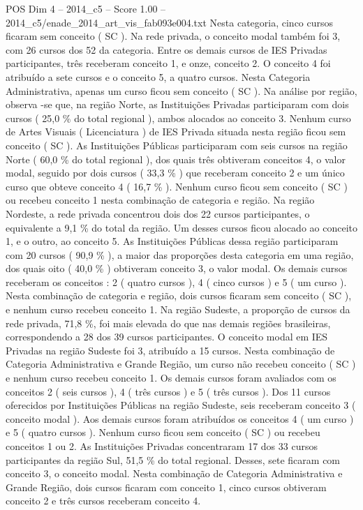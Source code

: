 \begin{textsample}{POS Dim 4 – 2014\_c5 – Score 1.00 – 2014\_c5/enade\_2014\_art\_vis\_fab093e004.txt}
Nesta categoria, cinco cursos ficaram sem conceito ( SC ).
Na rede privada, o conceito modal também foi 3, com 26 cursos dos 52 da categoria.
Entre os demais cursos de IES Privadas participantes, três receberam conceito 1, e onze, conceito 2.
O conceito 4 foi atribuído a sete cursos e o conceito 5, a quatro cursos.
Nesta Categoria Administrativa, apenas um curso ficou sem conceito ( SC ).
Na análise por região, observa -se que, na região Norte, as Instituições Privadas participaram com dois cursos ( 25,0 \% do total regional ), ambos alocados ao conceito 3.
Nenhum curso de Artes Visuais ( Licenciatura ) de IES Privada situada nesta região ficou sem conceito ( SC ).
As Instituições Públicas participaram com seis cursos na região Norte ( 60,0 \% do total regional ), dos quais três obtiveram conceitos 4, o valor modal, seguido por dois cursos ( 33,3 \% ) que receberam conceito 2 e um único curso que obteve conceito 4 ( 16,7 \% ).
Nenhum curso ficou sem conceito ( SC ) ou recebeu conceito 1 nesta combinação de categoria e região.
Na região Nordeste, a rede privada concentrou dois dos 22 cursos participantes, o equivalente a 9,1 \% do total da região.
Um desses cursos ficou alocado ao conceito 1, e o outro, ao conceito 5.
As Instituições Públicas dessa região participaram com 20 cursos ( 90,9 \% ), a maior das proporções desta categoria em uma região, dos quais oito ( 40,0 \% ) obtiveram conceito 3, o valor modal.
Os demais cursos receberam os conceitos : 2 ( quatro cursos ), 4 ( cinco cursos ) e 5 ( um curso ).
Nesta combinação de categoria e região, dois cursos ficaram sem conceito ( SC ), e nenhum curso recebeu conceito 1.
Na região Sudeste, a proporção de cursos da rede privada, 71,8 \%, foi mais elevada do que nas demais regiões brasileiras, correspondendo a 28 dos 39 cursos participantes.
O conceito modal em IES Privadas na região Sudeste foi 3, atribuído a 15 cursos.
Nesta combinação de Categoria Administrativa e Grande Região, um curso não recebeu conceito ( SC ) e nenhum curso recebeu conceito 1.
Os demais cursos foram avaliados com os conceitos 2 ( seis cursos ), 4 ( três cursos ) e 5 ( três cursos ).
Dos 11 cursos oferecidos por Instituições Públicas na região Sudeste, seis receberam conceito 3 ( conceito modal ).
Aos demais cursos foram atribuídos os conceitos 4 ( um curso ) e 5 ( quatro cursos ).
Nenhum curso ficou sem conceito ( SC ) ou recebeu conceitos 1 ou 2.
As Instituições Privadas concentraram 17 dos 33 cursos participantes da região Sul, 51,5 \% do total regional.
Desses, sete ficaram com conceito 3, o conceito modal.
Nesta combinação de Categoria Administrativa e Grande Região, dois cursos ficaram com conceito 1, cinco cursos obtiveram conceito 2 e três cursos receberam conceito 4.

\end{textsample}
